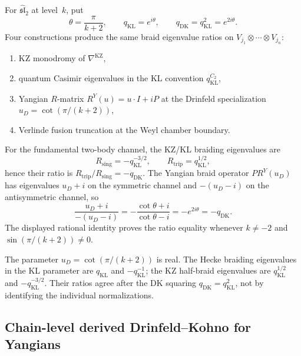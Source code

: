 \begin{computation}
\label{comp:dk0-four-path}
For $\widehat{\mathfrak{sl}}_2$ at level~$k$, put
\[
\theta=\frac{\pi}{k+2},\qquad
q_{\mathrm{KL}}=e^{i\theta},\qquad
q_{\mathrm{DK}}=q_{\mathrm{KL}}^2=e^{2i\theta}.
\]
Four constructions produce the same braid eigenvalue ratios on
$V_{j_1}\otimes\cdots\otimes V_{j_n}$:
\begin{enumerate}
\item KZ monodromy of $\nabla^{\mathrm{KZ}}$,
\item quantum Casimir eigenvalues in the KL convention
 $q_{\mathrm{KL}}^{C_2}$,
\item Yangian $R$-matrix $R^Y(u) = u\cdot I + iP$ at the Drinfeld specialization $u_D = \cot(\pi/(k+2))$,
\item Verlinde fusion truncation at the Weyl chamber boundary.
\end{enumerate}
For the fundamental two-body channel, the KZ/KL braiding eigenvalues
are
\[
R_{\mathrm{sing}}=-q_{\mathrm{KL}}^{-3/2},\qquad
R_{\mathrm{trip}}=q_{\mathrm{KL}}^{1/2},
\]
hence their ratio is
$R_{\mathrm{trip}}/R_{\mathrm{sing}}=-q_{\mathrm{DK}}$.
The Yangian braid operator $P R^Y(u_D)$ has eigenvalues
$u_D+i$ on the symmetric channel and $-(u_D-i)$ on the antisymmetric
channel, so
\[
\frac{u_D+i}{-(u_D-i)}
=-\frac{\cot\theta+i}{\cot\theta-i}
=-e^{2i\theta}
=-q_{\mathrm{DK}}.
\]
The displayed rational identity proves the ratio equality whenever
$k\ne-2$ and $\sin(\pi/(k+2))\ne0$.
\end{computation}

\begin{remark}
\label{rem:drinfeld-specialization-real}
The parameter $u_D = \cot(\pi/(k+2))$ is real. The Hecke braiding
eigenvalues in the KL parameter are $q_{\mathrm{KL}}$ and
$-q_{\mathrm{KL}}^{-1}$; the KZ half-braid eigenvalues are
$q_{\mathrm{KL}}^{1/2}$ and $-q_{\mathrm{KL}}^{-3/2}$. Their ratios
agree after the DK squaring
$q_{\mathrm{DK}}=q_{\mathrm{KL}}^2$, not by identifying the individual
normalizations.
\end{remark}

\subsection{Chain-level derived Drinfeld--Kohno for Yangians}

